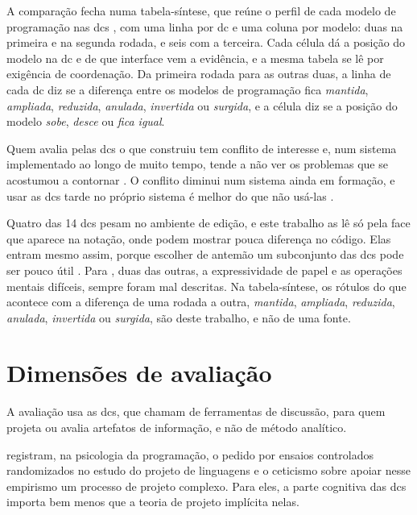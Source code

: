 A comparação fecha numa tabela-síntese, que reúne o perfil de cada
modelo de programação nas \glspl{dc} \cite[p. 107-108 e 118]{blackwell2003},
com uma linha por \gls{dc} e uma coluna por modelo: duas na primeira e
na segunda rodada, e seis com a terceira.
Cada célula dá a posição do modelo na \gls{dc} e de que interface vem a
evidência, e a mesma tabela se lê por exigência de coordenação.
Da primeira rodada para as outras duas, a linha de cada \gls{dc} diz se
a diferença entre os modelos de programação fica \emph{mantida},
\emph{ampliada}, \emph{reduzida}, \emph{anulada}, \emph{invertida} ou \emph{surgida}, e a célula
diz se a posição do modelo \emph{sobe}, \emph{desce} ou \emph{fica igual}.

Quem avalia pelas \glspl{dc} o que construiu tem conflito de
interesse e, num sistema implementado ao longo de muito tempo, tende a não
ver os problemas que se acostumou a contornar \cite{dagit2006}.
O conflito diminui num sistema ainda em formação, e usar as \glspl{dc}
tarde no próprio sistema é melhor do que não usá-las \cite{dagit2006}.

Quatro das 14 \glspl{dc} pesam no ambiente de edição, e este trabalho as
lê só pela face que aparece na notação, onde podem mostrar pouca diferença
no código.
Elas entram mesmo assim, porque escolher de antemão um subconjunto das
\glspl{dc} pode ser pouco útil \cite[p. 332]{blackwell2001}.
Para \textcite[p. 334]{green2006}, duas das outras, a expressividade de
papel e as operações mentais difíceis, sempre foram mal descritas.
Na tabela-síntese, os rótulos do que acontece com a diferença de uma
rodada a outra, \emph{mantida}, \emph{ampliada}, \emph{reduzida}, \emph{anulada},
\emph{invertida} ou \emph{surgida}, são deste trabalho, e não de uma fonte.
\section{Dimensões de avaliação}
\label{sec:dimensoes-de-avaliacao}
A avaliação usa as \glspl{dc}, que \textcite[p. 106]{blackwell2003} chamam de ferramentas
de discussão, para quem projeta ou avalia artefatos de informação, e não
de método analítico.

\textcite[p. 58 e 60]{blackwell2019} registram, na psicologia da
programação, o pedido por ensaios controlados randomizados no estudo do
projeto de linguagens e o ceticismo sobre apoiar nesse empirismo um
processo de projeto complexo.
Para eles, a parte cognitiva das \glspl{dc} importa bem menos que a teoria de
projeto implícita nelas.

